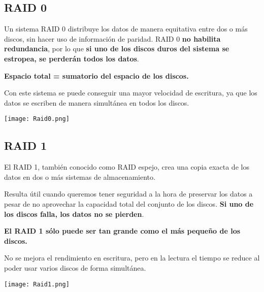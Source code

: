 \subsection{RAID 0}

\begin{minipage}{0.63\linewidth}
    \setlength{\parskip}{1.2em}

    Un sistema RAID 0 distribuye los datos de manera equitativa entre dos o más discos, sin hacer uso de información de paridad. RAID 0 \textbf{no habilita redundancia}, por lo que \textbf{si uno de los discos duros del sistema se estropea, se perderán todos los datos}.

    \textbf{Espacio total = sumatorio del espacio de los discos.}

    Con este sistema se puede conseguir una mayor velocidad de escritura, ya que los datos se escriben de manera simultánea en todos los discos.


\end{minipage}
\hfill
\begin{minipage}{0.28\linewidth}
    \texttt{[image: Raid0.png]}
    \vspace{-30pt}
\end{minipage}


\vspace{10pt}
\subsection{RAID 1}
\begin{minipage}{0.63\linewidth}
    \setlength{\parskip}{1.2em}
El RAID 1, también conocido como RAID espejo, crea una copia exacta de los datos en dos o más sistemas de almacenamiento.

Resulta útil cuando queremos tener seguridad a la hora de preservar los datos a pesar de no aprovechar la capacidad total del conjunto de los discos. \textbf{Si uno de los discos falla, los datos no se pierden}.

\textbf{El RAID 1 sólo puede ser tan grande como el más pequeño de los discos.}

No se mejora el rendimiento en escritura, pero en la lectura el tiempo se reduce al poder usar varios discos de forma simultánea.
\end{minipage}
\hfill
\begin{minipage}{0.28\linewidth}
\texttt{[image: Raid1.png]}
\vspace{-30pt}
\end{minipage}


